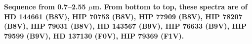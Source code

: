{\bf Sequence from 0.7–2.55 $\mu$m. From bottom to top, these spectra are of HD 144661 (B8V), HIP 70753 (B8V), HIP 77909 (B8V), HIP 78207 (B8V), HIP 79031 (B8V), HD 143567 (B9V), HIP 76633 (B9V), HIP 79599 (B9V), HD 137130 (F0V), HIP 79369 (F1V). \label{fig:stack-plot-b}}



